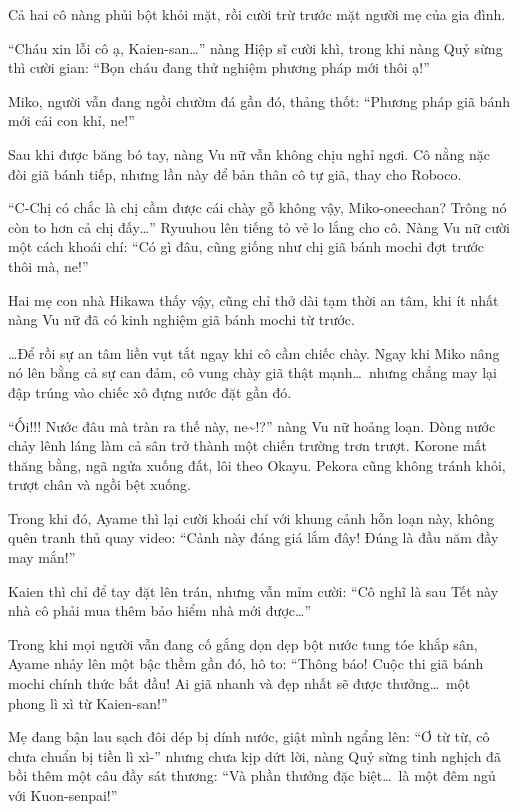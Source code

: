 \documentclass[../main.tex]{subfiles}
\begin{document}
Cả hai cô nàng phủi bột khỏi mặt, rồi cười trừ trước mặt người mẹ của gia đình.

``Cháu xin lỗi cô ạ, Kaien-san\dots'' nàng Hiệp sĩ cười khì, trong khi nàng Quỷ sừng thì cười gian: ``Bọn cháu đang thử nghiệm phương pháp mới thôi ạ!''

Miko, người vẫn đang ngồi chườm đá gần đó, thảng thốt: ``Phương pháp giã bánh mới cái con khỉ, ne!''

\ct

Sau khi được băng bó tay, nàng Vu nữ vẫn không chịu nghỉ ngơi. Cô nằng nặc đòi giã bánh tiếp, nhưng lần này để bản thân cô tự giã, thay cho Roboco.

``C-Chị có chắc là chị cầm được cái chày gỗ không vậy, Miko-oneechan? Trông nó còn to hơn cả chị đấy\dots'' Ryuuhou lên tiếng tỏ vẻ lo lắng cho cô. Nàng Vu nữ cười một cách khoái chí: ``Có gì đâu, cũng giống như chị giã bánh mochi đợt trước thôi mà, ne!''

Hai mẹ con nhà Hikawa thấy vậy, cũng chỉ thở dài tạm thời an tâm, khi ít nhất nàng Vu nữ đã có kinh nghiệm giã bánh mochi từ trước.

\dots Để rồi sự an tâm liền vụt tắt ngay khi cô cầm chiếc chày. Ngay khi Miko nâng nó lên bằng cả sự can đảm, cô vung chày giã thật mạnh\dots\ nhưng chẳng may lại đập trúng vào chiếc xô đựng nước đặt gần đó.

``Ối!!! Nước đâu mà tràn ra thế này, ne\~{}!?'' nàng Vu nữ hoảng loạn. Dòng nước chảy lênh láng làm cả sân trở thành một chiến trường trơn trượt. Korone mất thăng bằng, ngã ngửa xuống đất, lôi theo Okayu. Pekora cũng không tránh khỏi, trượt chân và ngồi bệt xuống.

Trong khi đó, Ayame thì lại cười khoái chí với khung cảnh hỗn loạn này, không quên tranh thủ quay video: ``Cảnh này đáng giá lắm đây! Đúng là đầu năm đầy may mắn!''

Kaien thì chỉ để tay đặt lên trán, nhưng vẫn mỉm cười: ``Cô nghĩ là sau Tết này nhà cô phải mua thêm bảo hiểm nhà mới được\dots''

\ct

Trong khi mọi người vẫn đang cố gắng dọn dẹp bột nước tung tóe khắp sân, Ayame nhảy lên một bậc thềm gần đó, hô to: ``Thông báo! Cuộc thi giã bánh mochi chính thức bắt đầu! Ai giã nhanh và đẹp nhất sẽ được thưởng\dots\ một phong lì xì từ Kaien-san!''

Mẹ đang bận lau sạch đôi dép bị dính nước, giật mình ngẩng lên: ``Ơ từ từ, cô chưa chuẩn bị tiền lì xì-'' nhưng chưa kịp dứt lời, nàng Quỷ sừng tinh nghịch đã bồi thêm một câu đầy sát thương: ``Và phần thưởng đặc biệt\dots\ là một đêm ngủ với Kuon-senpai!''
\end{document}

